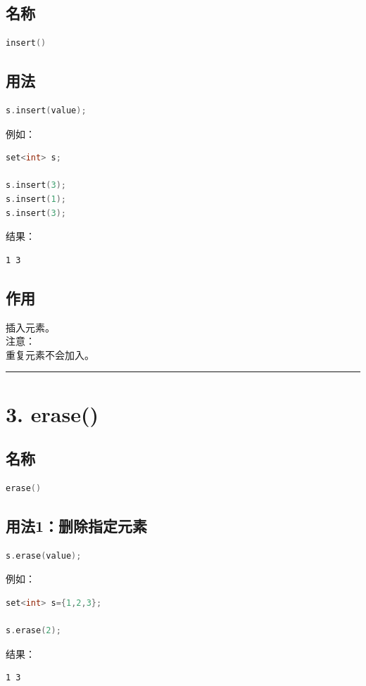 \documentclass[10pt,twocolumn]{extarticle}
\begin{document}
\subsection{名称}
\begin{lstlisting}[language=C++]
insert()
\end{lstlisting}

\subsection{用法}
\begin{lstlisting}[language=C++]
s.insert(value);
\end{lstlisting}
例如：
\begin{lstlisting}[language=C++]
set<int> s;

s.insert(3);
s.insert(1);
s.insert(3);
\end{lstlisting}
结果：
\begin{lstlisting}
1 3
\end{lstlisting}

\subsection{作用}
插入元素。\\
注意：\\
重复元素不会加入。

\noindent\rule{\linewidth}{0.4pt}

\section{3. erase()}

\subsection{名称}
\begin{lstlisting}[language=C++]
erase()
\end{lstlisting}

\subsection{用法1：删除指定元素}
\begin{lstlisting}[language=C++]
s.erase(value);
\end{lstlisting}
例如：
\begin{lstlisting}[language=C++]
set<int> s={1,2,3};

s.erase(2);
\end{lstlisting}
结果：
\begin{lstlisting}
1 3
\end{lstlisting}
\end{document}
